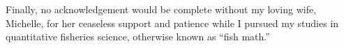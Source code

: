 \begin{romanpages}
\begin{acknowledgments}
Finally, no acknowledgement would be complete without my loving wife, Michelle, for her ceaseless support and patience while I pursued my studies in quantitative fisheries science, otherwise known as ``fish math.''
\end{acknowledgments}

\newpage

\begin{singlespace}
	\tableofcontents
	\clearpage
	\listoffigures
	\clearpage
	\listoftables
\end{singlespace}

\end{romanpages}        %

\normalem       %

\setlength{\parskip}{0pt plus 0pt minus 0pt}

\doublespacing
